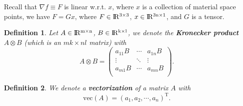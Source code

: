 \documentclass{fancydoc}
\newtheorem{mydef}{Definition}
\newcommand{\trans}{\mathrm{T}}
\newcommand{\realR}{\rm I\!R}
\begin{document}
Recall that $\nabla f \equiv F$ is linear w.r.t. $x$, where $x$ is a collection of material space points, we have $F = G x$, where $F \in \realR^{3 \times 3}$, $x \in \realR^{3n \times 1}$, and $G$ is a tensor.

\begin{mydef}
	Let $A \in \realR^{m \times n}$, $B \in \realR^{k \times l}$, we denote the \textbf{Kronecker product} $A \otimes B$ (which is  an $mk \times nl$ matrix) with \begin{equation}
	A \otimes B = \begin{pmatrix}
	a_{11}B & \cdots & a_{1n}B \\
	\vdots & \ddots & \vdots \\
	a_{m1}B & \cdots & a_{mn}B\\
	\end{pmatrix}.
	\end{equation}
\end{mydef}
\begin{mydef}
	We denote a \textbf{vectorization} of a matrix $A$ with
	\begin{equation}
	\mathrm{vec}(A) = (a_1, a_2, \cdots, a_n)^\trans.
	\end{equation}
\end{mydef}
\end{document}
